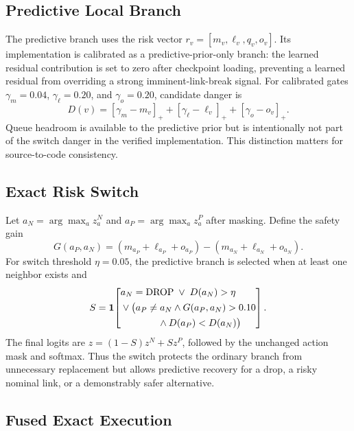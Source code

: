 \documentclass{ieeeaccess}
\newcommand{\drop}{\mathrm{DROP}}
\begin{document}
\subsection{Predictive Local Branch}

The predictive branch uses the risk vector $r_v=[m_v,\ell_v,q_v,o_v]$. Its implementation is calibrated as a predictive-prior-only branch: the learned residual contribution is set to zero after checkpoint loading, preventing a learned residual from overriding a strong imminent-link-break signal. For calibrated gates $\gamma_m=0.04$, $\gamma_\ell=0.20$, and $\gamma_o=0.20$, candidate danger is
\begin{equation}
D(v)=[\gamma_m-m_v]_+ + [\gamma_\ell-\ell_v]_+ + [\gamma_o-o_v]_+.
\label{eq:danger}
\end{equation}
Queue headroom is available to the predictive prior but is intentionally not part of the switch danger in the verified implementation. This distinction matters for source-to-code consistency.

\subsection{Exact Risk Switch}

Let $a_N=\arg\max_a z^N_a$ and $a_P=\arg\max_a z^P_a$ after masking. Define the safety gain
\begin{equation}
G(a_P,a_N)=(m_{a_P}+\ell_{a_P}+o_{a_P})-(m_{a_N}+\ell_{a_N}+o_{a_N}).
\end{equation}
For switch threshold $\eta=0.05$, the predictive branch is selected when at least one neighbor exists and
\begin{equation}
S=\mathbf{1}\!\left[
\begin{aligned}
&a_N=\drop\;\lor\;D(a_N)>\eta\\
&{}\lor\big(a_P\neq a_N\land G(a_P,a_N)>0.10\\
&\hspace{3.9em}{}\land D(a_P)<D(a_N)\big)
\end{aligned}
\right].
\label{eq:switch}
\end{equation}
The final logits are $z=(1-S)z^N+Sz^P$, followed by the unchanged action mask and softmax. Thus the switch protects the ordinary branch from unnecessary replacement but allows predictive recovery for a drop, a risky nominal link, or a demonstrably safer alternative.

\subsection{Fused Exact Execution}
\end{document}
